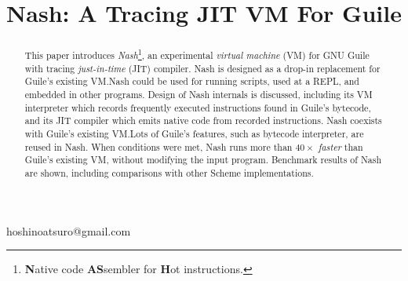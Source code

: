 \documentclass[preprint, 10pt]{sigplanconf}
\begin{document}
\setlength{\pdfpageheight}{\paperheight}
\setlength{\pdfpagewidth}{\paperwidth}





\title{Nash: A Tracing JIT VM For Guile}

           {}
           {hoshinoatsuro@gmail.com}

\maketitle

\begin{abstract}

This paper introduces \textit{Nash}\footnote{\textbf{N}ative code
  \textbf{AS}sembler for \textbf{H}ot instructions.}, an experimental
\textit{virtual machine} (VM) for GNU Guile with tracing \textit{just-in-time}
(JIT) compiler. Nash is designed as a drop-in replacement for Guile's existing
VM.\@ Nash could be used for running scripts, used at a REPL, and embedded in
other programs. Design of Nash internals is discussed, including its VM
interpreter which records frequently executed instructions found in Guile's
bytecode, and its JIT compiler which emits native code from recorded
instructions. Nash coexists with Guile's existing VM.\@ Lots of Guile's
features, such as bytecode interpreter, are reused in Nash. When conditions were
met, Nash runs more than \textit{$40\times$ faster} than Guile's existing VM,
without modifying the input program. Benchmark results of Nash are shown,
including comparisons with other Scheme implementations.




\end{abstract}
\end{document}
